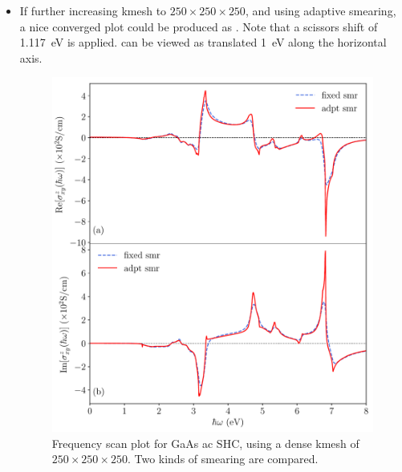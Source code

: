 \begin{itemize}
\item If further increasing kmesh to $250\times250\times250$, and using adaptive smearing, 
a nice converged plot could be produced as . 
Note that a scissors shift of 1.117~eV is applied. 
 can be viewed as  translated 
1~eV along the horizontal axis. 
\begin{figure}
\centering
\includegraphics[width=0.8\columnwidth]{figure/example30/gaas_freqscan.pdf}
\caption{Frequency scan plot for GaAs ac SHC, using 
	a dense kmesh of $250\times250\times250$. 
Two kinds of smearing are compared.}
\label{fig30.2}
\end{figure}
\end{itemize}